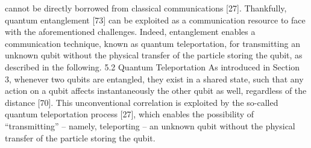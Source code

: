 cannot be directly borrowed from classical communications [27]. Thankfully, quantum entanglement [73] can be exploited as a communication resource to face with the aforementioned challenges. Indeed, entanglement enables a communication technique, known as quantum teleportation, for transmitting an unknown qubit without the physical transfer of the particle storing the qubit, as described in the following. 5.2 Quantum Teleportation As introduced in Section 3, whenever two qubits are entangled, they exist in a shared state, such that any action on a qubit affects instantaneously the other qubit as well, regardless of the distance [70]. This unconventional correlation is exploited by the so-called quantum teleportation process [27], which enables the possibility of “transmitting” – namely, teleporting – an unknown qubit without the physical transfer of the particle storing the qubit.


